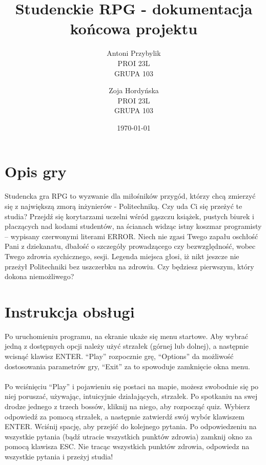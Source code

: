 \documentclass[12pt, titlepage]{article}
\author{Antoni Przybylik \\ PROI 23L \\ GRUPA 103 \and
	Zoja Hordyńska \\ PROI 23L \\ GRUPA 103}
\date{\today}
\title{Studenckie RPG - dokumentacja końcowa projektu}
\begin{document}
\maketitle
\justifying



\hypersetup{
	colorlinks=true,
	linkcolor=blue,
}

\lstset{style=listingstyle}

\section{Opis gry}
Studencka gra RPG to wyzwanie dla
miłośników przygód, którzy chcą zmierzyć
się z największą zmorą inżynierów - Politechniką.
Czy uda Ci się przeżyć te studia?
Przejdź się korytarzami uczelni wśród
gąszczu książek, pustych biurek i
płaczących nad kodami studentów, na ścianach
widząc istny koszmar programisty – wypisany
czerwonymi literami ERROR. Niech nie zgasi
Twego zapału oschłość Pani z dziekanatu,
dbałość o szczegóły prowadzącego czy
bezwzględność, wobec Twego zdrowia
sychicznego, sesji. Legenda miejsca
głosi, iż nikt jeszcze nie przeżył
Politechniki bez uszczerbku na zdrowiu.
Czy będziesz pierwszym, który dokona
niemożliwego? 

\section{Instrukcja obsługi}
Po uruchomieniu programu, na ekranie ukaże
się menu startowe. Aby wybrać jedną z
dostępnych opcji należy użyć strzałek
(górnej lub dolnej), a następnie wcisnąć
klawisz ENTER. "`Play"' rozpocznie grę,
"`Options"' da możliwość dostosowania
parametrów gry, "`Exit"' za to spowoduje
zamknięcie okna menu.  
\\~\\
Po wciśnięciu "`Play"' i pojawieniu się
postaci na mapie, możesz swobodnie się
po niej poruszać, używając, intuicyjnie
działających, strzałek. Po spotkaniu na
swej drodze jednego z trzech bossów,
kliknij na niego, aby rozpocząć quiz.
Wybierz odpowiedź za pomocą strzałek,
a następnie zatwierdź swój wybór klawiszem
ENTER. Wciśnij spację, aby przejść do
kolejnego pytania. Po odpowiedzeniu na
wszystkie pytania (bądź utracie wszystkich
punktów zdrowia) zamknij okno za pomocą
klawisza ESC. Nie tracąc wszystkich
punktów zdrowia, odpowiedz na wszystkie
pytania i przeżyj studia! 
\end{document}
